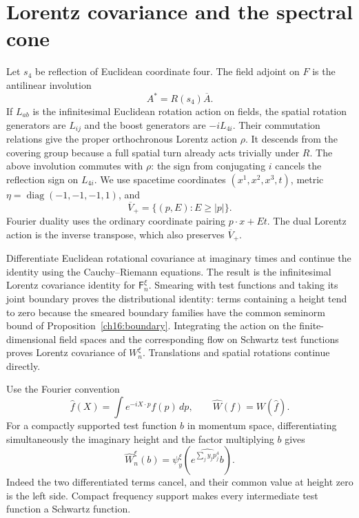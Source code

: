 \section{Lorentz covariance and the spectral cone}
\label{ch16:covariance-section}

Let $s_4$ be reflection of Euclidean coordinate four. The field adjoint
on $F$ is the antilinear involution
\[
                       A^*=R(s_4)\overline A.
\]
If $L_{ab}$ is the infinitesimal Euclidean rotation action on fields,
the spatial rotation generators are $L_{ij}$ and the boost generators
are $-iL_{4i}$. Their commutation relations give the proper orthochronous
Lorentz action $\rho$. It descends from the covering group because a full
spatial turn already acts trivially under $R$. The above involution
commutes with $\rho$: the sign from conjugating $i$ cancels the reflection
sign on $L_{4i}$. We use spacetime coordinates $(x^1,x^2,x^3,t)$,
metric $\eta=\operatorname{diag}(-1,-1,-1,1)$, and
\[
 \overline V_+=\{(p,E):E\ge|p|\}.
\]
Fourier duality uses the ordinary coordinate pairing $p\cdot x+Et$.
The dual Lorentz action is the inverse transpose, which also preserves
$\overline V_+$.

Differentiate Euclidean rotational covariance at imaginary times and
continue the identity using the Cauchy--Riemann equations. The result
is the infinitesimal Lorentz covariance identity for $\mathsf F_n^\xi$.
Smearing with test functions and taking its joint boundary proves the distributional identity:
terms containing a height tend to zero because the smeared boundary
families have the common seminorm bound of Proposition~\ref{ch16:boundary}.
Integrating the action on the finite-dimensional field spaces and the corresponding
flow on Schwartz test functions proves Lorentz covariance of $W_n^\xi$.
Translations and spatial rotations continue directly.

Use the Fourier convention
\[
 \widehat f(X)=\int e^{-iX\cdot p}f(p)\,dp,
 \qquad \widehat W(f)=W(\widehat f).
\]
For a compactly supported test function $b$ in momentum space, differentiating simultaneously
the imaginary height and the factor multiplying $b$ gives
\begin{equation}
 \widehat W_n^\xi(b)
   =\psi_y^\xi\!\left(\widehat{e^{\sum_jy_jp_j^4}b}\right).
 \label{ch16:laplace}
\end{equation}
Indeed the two differentiated terms cancel, and their common value at
height zero is the left side. Compact frequency support makes every
intermediate test function a Schwartz function.

